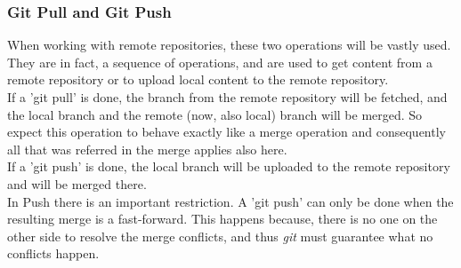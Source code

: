\subsubsection{Git Pull and Git Push}

When working with remote repositories, these two operations will be vastly
used. They are in fact, a sequence of operations, and are used to get content
from a remote repository or to upload local content to the remote repository.
\\
If a 'git pull' is done, the branch from the remote repository will be fetched,
and the local branch and the remote (now, also local) branch will be merged. So
expect this operation to behave exactly like a merge operation and consequently
all that was referred in the merge applies also here. \\
If a 'git push' is done, the local branch will be uploaded to the remote 
repository and will be merged there. \\
In Push there is an important restriction. A 'git push' 
can only be done when the resulting merge is a
fast-forward. This happens because, there is no one on the other side to resolve the 
merge conflicts, and thus \emph{git} must guarantee what no conflicts happen. 
